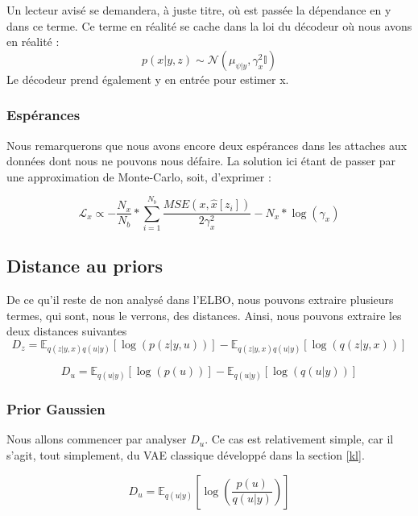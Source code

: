 \documentclass{article}
\begin{document}
Un lecteur avisé se demandera, à juste titre, où est passée la dépendance en y dans ce terme. Ce terme en réalité se cache dans la loi du décodeur où nous avons en réalité :
\begin{equation}
    p(x|y,z) \sim \mathcal{N}(\mu_{\psi|y}, \gamma_x^2\mathbb{I})
\end{equation}
Le décodeur prend également y en entrée pour estimer x.

\subsubsection{Espérances}
Nous remarquerons que nous avons encore deux espérances dans les attaches aux données dont nous ne pouvons nous défaire. La solution ici étant de passer par une approximation de Monte-Carlo, soit, d'exprimer :

\begin{equation*}
    \mathcal{L}_x \propto -\frac{N_x}{N_b}*\sum_{i=1}^{N_b}\frac{MSE(x,\hat{x}[z_i])}{2\gamma_x^2} - N_x*\log(\gamma_x)
\end{equation*}




\subsection{Distance au priors}\label{srkl}

De ce qu'il reste de non analysé dans l'ELBO, nous pouvons extraire plusieurs termes, qui sont, nous le verrons, des distances.
Ainsi, nous pouvons extraire les deux distances suivantes 
\begin{equation*}
 D_z = \mathbb{E}_{q(z|y,x)q(u|y)}\left[\log(p(z|y,u))\right]- \mathbb{E}_{q(z|y,x)q(u|y)}\left[\log(q(z|y,x))\right]
\end{equation*}
    
\begin{equation*}
 D_u = \mathbb{E}_{q(u|y)}\left[\log(p(u))\right] - \mathbb{E}_{q(u|y)}\left[\log(q(u|y))\right]
\end{equation*}

\subsubsection{Prior Gaussien}
Nous allons commencer par analyser $D_u$. Ce cas est relativement simple, car il s'agit, tout simplement, du VAE classique développé dans la section \ref{kl}.

\begin{equation*}
 D_u = \mathbb{E}_{q(u|y)}\left[\log\left(\frac{p(u)}{q(u|y)}\right)\right]
\end{equation*}
\end{document}

